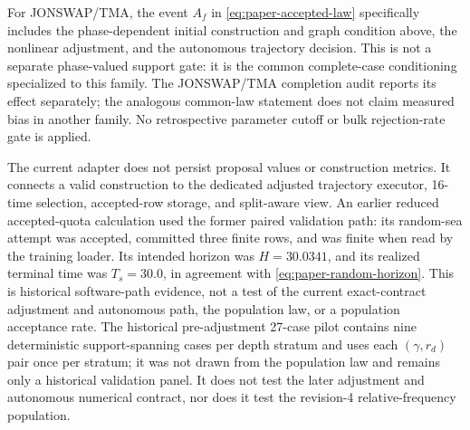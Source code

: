 For JONSWAP/TMA, the event \(A_f\) in
\cref{eq:paper-accepted-law} specifically includes the phase-dependent initial
construction and graph condition above, the nonlinear adjustment, and the
autonomous trajectory decision.  This is not a separate phase-valued support
gate: it is the common complete-case conditioning specialized to this family.
The JONSWAP/TMA completion audit reports its effect separately; the analogous
common-law statement does not claim measured bias in another family.  No
retrospective parameter cutoff or bulk rejection-rate gate is applied.

The current adapter does not persist proposal values or construction metrics.
It connects a valid construction to the dedicated adjusted trajectory
executor, 16-time selection, accepted-row storage, and split-aware view.  An
earlier reduced accepted-quota calculation
used the former paired validation path: its random-sea attempt was accepted,
committed three finite rows, and was finite when read by the training loader.  Its
intended horizon was \(H=30.0341\), and its realized terminal time was
\(T_s=30.0\), in agreement with \cref{eq:paper-random-horizon}.  This is
historical software-path evidence, not a test of the current exact-contract
adjustment and autonomous path, the population law, or a population acceptance
rate.
The historical pre-adjustment 27-case pilot contains nine deterministic
support-spanning cases
per depth stratum and uses each $(\gamma,r_d)$ pair once per stratum; it was
not drawn from the population law and remains only a historical validation
panel.  It does not test the later adjustment and autonomous numerical
contract, nor does it test the revision-4 relative-frequency population.

